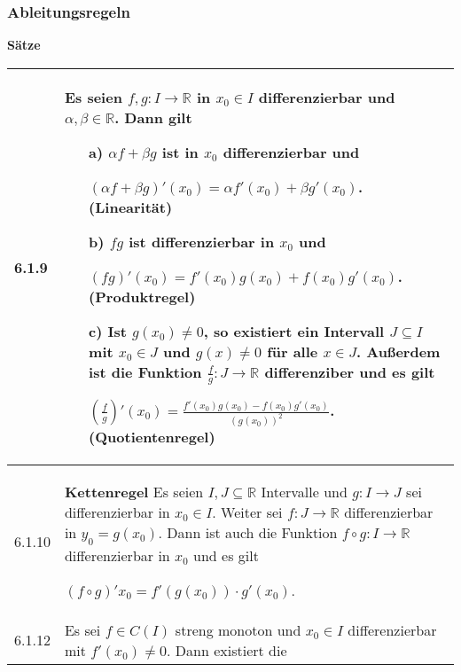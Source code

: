     \pagebreak

\subsubsection{Ableitungsregeln}

    \noindent 
    \textbf{Sätze}
    \begin{table}[H]
    \begin{tabularx}{\textwidth}{X m{16cm}}
        \toprule

        6.1.9 & Es seien $f,g: I \rightarrow \mathbb{R}$ in $x_0 \in I$ differenzierbar und $\alpha,\beta \in \mathbb{R}$. Dann gilt
                \begin{itemize}[topsep=-0.5cm]
                    \item[a)] $\alpha f +\beta g$ ist in $x_0$ differenzierbar und \hfill \break
                                \centerline{$(\alpha f + \beta g)'(x_0) = \alpha f'(x_0) + \beta g'(x_0)$. \textbf{(Linearität)}}
                    \item[b)] $fg$ ist differenzierbar in $x_0$ und \hfill \break
                                \centerline{$ (fg)'(x_0)=f'(x_0)g(x_0) + f(x_0)g'(x_0)$. (\textbf{Produktregel})}
                    \item[c)] Ist $g(x_0) \neq 0$, so existiert ein Intervall $J \subseteq I$ mit $x_0 \in J$ und $g(x) \neq 0$ für
                                alle $x \in J$. Außerdem ist die Funktion $\frac{f}{g}: J \rightarrow \mathbb{R}$ 
                                differenziber und es gilt \hfill \break
                                \centerline{$(\frac{f}{g})'(x_0)= \frac{f'(x_0)g(x_0)-f(x_0)g'(x_0)}{(g(x_0))^2}$. (\textbf{Quotientenregel})} 
                \end{itemize} \vspace{-0cm} \\
        \midrule
        6.1.10& \textbf{Kettenregel} \hfill \break
                Es seien $I, J \subseteq \mathbb{R}$ Intervalle und $g: I \rightarrow J$ sei differenzierbar in $x_0 \in I$.
                Weiter sei $f:J \rightarrow \mathbb{R}$ differenzierbar in $y_0 = g(x_0)$. Dann ist auch die Funktion
                $f \circ g: I \rightarrow \mathbb{R}$ differenzierbar in $x_0$ und es gilt \hfill \break
                \centerline{$(f\circ g)'x_0 = f'(g(x_0)) \cdot g'(x_0)$.} \\
        \midrule
        6.1.12& Es sei $f \in C(I)$ streng monoton und $x_0 \in I$ differenzierbar mit \textbf{$f'(x_0) \neq 0$}. Dann existiert die

\end{tabularx}
\end{table}
